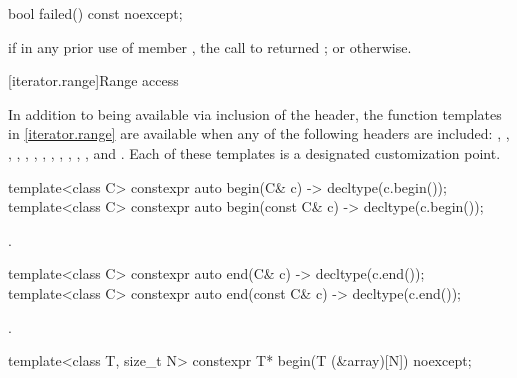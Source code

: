 %
\begin{itemdecl}
bool failed() const noexcept;
\end{itemdecl}

\begin{itemdescr}
\pnum
\returns
{}
if in any prior use of member
,
the call to
returned
;
or
otherwise.
\end{itemdescr}

[iterator.range]{Range access}

\pnum
In addition to being available via inclusion of the  header,
the function templates in \ref{iterator.range} are available when any of the following
headers are included:
,
,
,
,
,
,
,
,
,
,
,
, and
.
Each of these templates
is a designated customization point.

%
\begin{itemdecl}
template<class C> constexpr auto begin(C& c) -> decltype(c.begin());
template<class C> constexpr auto begin(const C& c) -> decltype(c.begin());
\end{itemdecl}

\begin{itemdescr}
\pnum
\returns
{}.
\end{itemdescr}

%
\begin{itemdecl}
template<class C> constexpr auto end(C& c) -> decltype(c.end());
template<class C> constexpr auto end(const C& c) -> decltype(c.end());
\end{itemdecl}

\begin{itemdescr}
\pnum
\returns
{}.
\end{itemdescr}

%
\begin{itemdecl}
template<class T, size_t N> constexpr T* begin(T (&array)[N]) noexcept;
\end{itemdecl}

